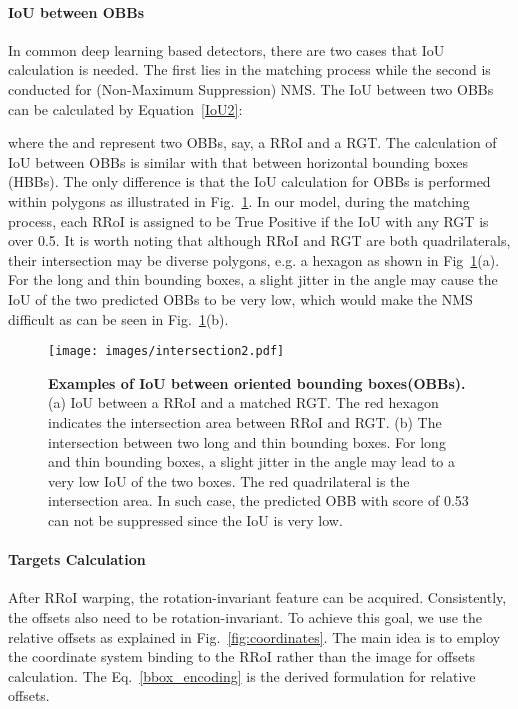 \documentclass[11pt,onecolumn]{article}         \usepackage[top=3.6cm, bottom=3.2cm, left=2.3cm, right=2.3cm]{geometry}
\begin{document}
\paragraph{IoU between OBBs}\label{IoUBPolygon}
In common deep learning based detectors, there are two cases that IoU calculation is needed. The first lies in the matching process while the second is conducted for (Non-Maximum Suppression) NMS. The IoU between two OBBs can be calculated by Equation~\ref{IoU2}:

where the  and  represent two OBBs, say, a RRoI and a RGT. The calculation of IoU between OBBs is similar with that between horizontal bounding boxes (HBBs). The only difference is that the IoU calculation for OBBs is performed within polygons as illustrated in Fig.~\ref{fig:Vis_IoU}. In our model, during the matching process, each RRoI is assigned to be True Positive if the IoU with any RGT is over 0.5. It is worth noting that although RRoI and RGT are both quadrilaterals, their intersection may be diverse polygons, e.g. a hexagon as shown in Fig~\ref{fig:Vis_IoU}(a).
For the long and thin bounding boxes, a slight jitter in the angle may cause the IoU of the two predicted OBBs to be very low, which would make the NMS difficult as can be seen in Fig.~\ref{fig:Vis_IoU}(b).

 \begin{figure}[htp!]
    \centering
    \texttt{[image: images/intersection2.pdf]}
\caption{{\bf Examples of IoU between oriented bounding boxes(OBBs).} (a) IoU between a RRoI and a matched RGT. The red hexagon indicates the intersection area between RRoI and RGT. (b) The intersection between two long and thin bounding boxes. For long and thin bounding boxes, a slight jitter in the angle may lead to a very low IoU of the two boxes. The red quadrilateral is the intersection area. In such case, the predicted OBB with score of 0.53 can not be suppressed since the IoU is very low.
    }
\label{fig:Vis_IoU}
\end{figure}



\paragraph{Targets Calculation}
After RRoI warping, the rotation-invariant feature can be acquired. Consistently, the offsets also need to be rotation-invariant. 
To achieve this goal, we use the relative offsets as explained in Fig.~\ref{fig:coordinates}. The main idea is to employ the coordinate system binding to the RRoI rather than the image for offsets calculation.
The Eq.~\eqref{bbox_encoding} is the derived formulation for relative offsets.
\end{document}

